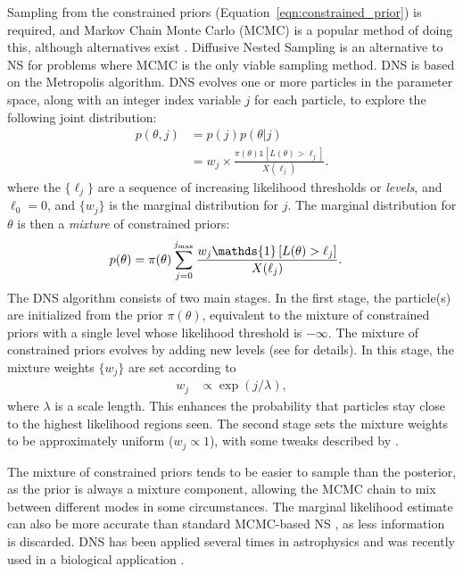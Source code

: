 \documentclass[article]{jss}
\begin{document}
Sampling from the constrained priors (Equation~\ref{eqn:constrained_prior})
is required, and Markov Chain Monte Carlo (MCMC) is a popular method of doing
this, although alternatives exist \citep[e.g.][]{multinest, 2015MNRAS.453.4384H}.
Diffusive Nested Sampling \citep[DNS][]{dnest} is an alternative to NS for
problems where MCMC is the only viable sampling method. DNS is based on the
Metropolis algorithm. DNS evolves one or more particles in the parameter space, along with
an integer index variable $j$ for each particle,
to explore the following joint distribution:
\begin{align}
p(\theta, j) &= p(j)p(\theta | j)\\
&= w_j \times
\frac{\pi(\theta)\mathds{1}\left[L(\theta) > \ell_j\right]}{X(\ell_j)}.
\label{eqn:target_distribution}
\end{align}
where the $\{\ell_j\}$ are a sequence of increasing likelihood thresholds
or {\em levels}, and
$\ell_0 = 0$, and $\{w_j\}$ is the marginal distribution for $j$.
The marginal distribution for $\theta$ is then a {\em mixture} of
constrained priors:
\begin{align}
p(\theta) &=
\pi(\theta)\sum_{j=0}^{j_{\rm max}}
\frac{w_j\mathds{1}\left[L(\theta) > \ell_j\right]}{X(\ell_j)}.
\label{eqn:mixture_of_constrained_priors}
\end{align}
The DNS algorithm consists of two main stages. In the first stage,
the particle(s) are initialized from the prior $\pi(\theta)$, equivalent
to the mixture of constrained priors with a single level whose likelihood
threshold is $-\infty$. The mixture of constrained priors evolves by adding new levels
(see \citet{dnest} for details). In this stage,
the mixture weights $\{w_j\}$ are set according to
\begin{align}
w_j &\propto \exp(j/\lambda),\label{eqn:weighting}
\end{align}
where $\lambda$ is a scale length.
This enhances the probability that particles stay close to the
highest likelihood regions seen.
The second stage sets the mixture weights to be approximately
uniform ($w_j \propto 1$), with some tweaks described by \citet{dnest}.

The mixture of constrained priors tends to be easier to sample than the
posterior, as the prior is always a mixture component, allowing the
MCMC chain to mix between different modes in some circumstances. The marginal
likelihood estimate can also be more accurate than standard MCMC-based NS
\citep{dnest}, as less information is discarded.
DNS has been applied several times in astrophysics
\citep[e.g.][]{2014MNRAS.445.3055P, 2015ApJ...810...66H, 2015MNRAS.448.3206B}
and was recently used in a biological application \citep{salmonella}.
\end{document}
